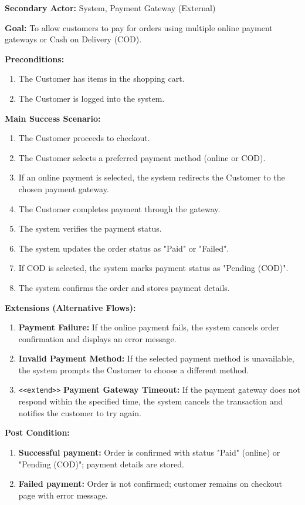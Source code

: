 \textbf{Secondary Actor:} System, Payment Gateway (External)

\textbf{Goal:} To allow customers to pay for orders using multiple online payment gateways or Cash on Delivery (COD).

\textbf{Preconditions:}
\begin{enumerate}
    \item The Customer has items in the shopping cart.
    \item The Customer is logged into the system.
\end{enumerate}

\textbf{Main Success Scenario:}
\begin{enumerate}
    \item The Customer proceeds to checkout.
    \item The Customer selects a preferred payment method (online or COD).
    \item If an online payment is selected, the system redirects the Customer to the chosen payment gateway.
    \item The Customer completes payment through the gateway.
    \item The system verifies the payment status.
    \item The system updates the order status as "Paid" or "Failed".
    \item If COD is selected, the system marks payment status as "Pending (COD)".
    \item The system confirms the order and stores payment details.
\end{enumerate}

\textbf{Extensions (Alternative Flows):}
\begin{enumerate}
    \item[3a.] \textbf{Payment Failure:} If the online payment fails, the system cancels order confirmation and displays an error message.
    \item[3b.] \textbf{Invalid Payment Method:} If the selected payment method is unavailable, the system prompts the Customer to choose a different method.
    \item[4a.] \texttt{\textless\textless extend\textgreater\textgreater} \textbf{Payment Gateway Timeout:} If the payment gateway does not respond within the specified time, the system cancels the transaction and notifies the customer to try again.
\end{enumerate}

\textbf{Post Condition:}
\begin{enumerate}
    \item \textbf{Successful payment:} Order is confirmed with status "Paid" (online) or "Pending (COD)"; payment details are stored.
    \item \textbf{Failed payment:} Order is not confirmed; customer remains on checkout page with error message.
\end{enumerate}


